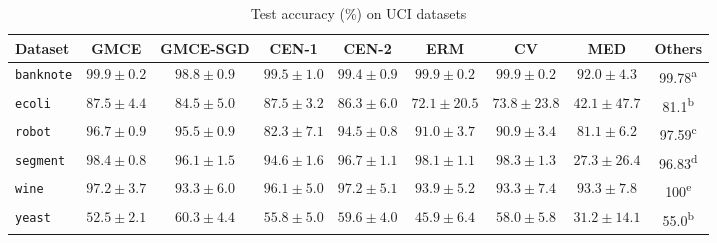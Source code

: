 \documentclass[twoside]{article}
\begin{document}
		\begin{table*}[t]
			\caption{Test accuracy (\%) on UCI datasets}
			\label{tab:uci_experiments}
			\centering
			\begin{tabular}{lcccccccc}	
				Dataset & G\gls{MCE} & G\gls{MCE}-SGD & \gls{CEN}-1 & \gls{CEN}-2 & ERM & CV & MED & Others \\
				\midrule
				\texttt{banknote} & $\mathbf{99.9 \pm 0.2}$ & $98.8 \pm 0.9$ & $99.5 \pm 1.0$ & $99.4 \pm 0.9$ & $\mathbf{99.9 \pm 0.2}$ & $\mathbf{99.9 \pm 0.2}$ & $92.0 \pm 4.3$ & 99.78\textsuperscript{a} \\
				\texttt{ecoli} & $\mathbf{87.5 \pm 4.4}$ & $84.5 \pm 5.0$ & $\mathbf{87.5 \pm 3.2}$ & $86.3 \pm 6.0$ & $72.1 \pm 20.5$ & $73.8 \pm 23.8$ & $42.1 \pm 47.7$ & 81.1\textsuperscript{b} \\
				\texttt{robot} & $\mathbf{96.7 \pm 0.9}$ & $95.5 \pm 0.9$ & $82.3 \pm 7.1$ & $94.5 \pm 0.8$ & $91.0 \pm 3.7$ & $90.9 \pm 3.4$ & $81.1 \pm 6.2$ & 97.59\textsuperscript{c} \\
				\texttt{segment} & $\mathbf{98.4 \pm 0.8}$ & $96.1 \pm 1.5$ & $94.6 \pm 1.6$ & $96.7 \pm 1.1$ & $98.1 \pm 1.1$ & $98.3 \pm 1.3$ & $27.3 \pm 26.4$ & 96.83\textsuperscript{d} \\
				\texttt{wine} & $\mathbf{97.2 \pm 3.7}$ & $93.3 \pm 6.0$ & $96.1 \pm 5.0$ & $97.2 \pm 5.1$ & $93.9 \pm 5.2$ & $93.3 \pm 7.4$ & $93.3 \pm 7.8$ & 100\textsuperscript{e} \\
				\texttt{yeast} & $52.5 \pm 2.1$ & $\mathbf{60.3 \pm 4.4}$ & $55.8 \pm 5.0$ & $59.6 \pm 4.0$ & $45.9 \pm 6.4$ & $58.0 \pm 5.8$ & $31.2 \pm 14.1$ & 55.0\textsuperscript{b} \\
			\end{tabular}
		\end{table*}
		
\end{document}
